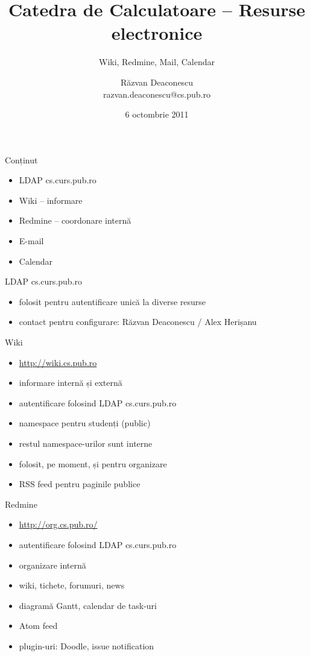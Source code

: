 \documentclass{simple}
\title[CSE Tools]{Catedra de Calculatoare -- Resurse electronice}
\subtitle{Wiki, Redmine, Mail, Calendar}
\institute{Catedra de Calculatoare}
\author[Răzvan Deaconescu]{Răzvan Deaconescu\\
      razvan.deaconescu@cs.pub.ro}
\date{6 octombrie 2011}
\begin{document}
\frame{\titlepage}

\begin{frame}{Conținut}
  \begin{itemize}
    \item LDAP cs.curs.pub.ro
    \item Wiki -- informare
    \item Redmine -- coordonare internă
    \item E-mail
    \item Calendar
  \end{itemize}
\end{frame}

\begin{frame}{LDAP cs.curs.pub.ro}
  \begin{itemize}
    \item folosit pentru autentificare unică la diverse resurse
    \item contact pentru configurare: Răzvan Deaconescu / Alex Herișanu
  \end{itemize}
\end{frame}

\begin{frame}{Wiki}
  \begin{itemize}
    \item \url{http://wiki.cs.pub.ro}
    \item informare internă și externă
    \item autentificare folosind LDAP cs.curs.pub.ro
    \item namespace pentru studenți (public)
    \item restul namespace-urilor sunt interne
    \item folosit, pe moment, și pentru organizare
    \item RSS feed pentru paginile publice
  \end{itemize}
\end{frame}

\begin{frame}{Redmine}
  \begin{itemize}
    \item \url{http://org.cs.pub.ro/}
    \item autentificare folosind LDAP cs.curs.pub.ro
    \item organizare internă
    \item wiki, tichete, forumuri, news
    \item diagramă Gantt, calendar de task-uri
    \item Atom feed
    \item plugin-uri: Doodle, issue notification
  \end{itemize}
\end{frame}
\end{document}
